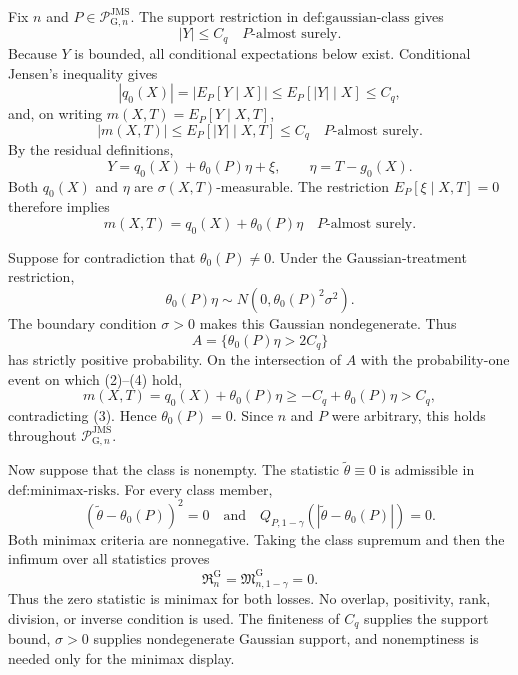 Fix \(n\) and \(P\in\mathcal P_{\mathrm G,n}^{\mathrm{JMS}}\).  The support restriction in \(\text{def:gaussian-class}\) gives
\[
 |Y|\le C_q
 \quad P\text{-almost surely}. \tag{1}
\]
Because \(Y\) is bounded, all conditional expectations below exist.  Conditional Jensen's inequality gives
\[
 |q_0(X)|=|E_P[Y\mid X]|
 \le E_P[|Y|\mid X]\le C_q, \tag{2}
\]
and, on writing \(m(X,T)=E_P[Y\mid X,T]\),
\[
 |m(X,T)|\le E_P[|Y|\mid X,T]\le C_q
 \quad P\text{-almost surely}. \tag{3}
\]
By the residual definitions,
\[
 Y=q_0(X)+\theta_0(P)\eta+\xi,
 \qquad
 \eta=T-g_0(X).
\]
Both \(q_0(X)\) and \(\eta\) are \(\sigma(X,T)\)-measurable.  The restriction \(E_P[\xi\mid X,T]=0\) therefore implies
\[
 m(X,T)=q_0(X)+\theta_0(P)\eta
 \quad P\text{-almost surely}. \tag{4}
\]

Suppose for contradiction that \(\theta_0(P)\ne0\).  Under the Gaussian-treatment restriction,
\[
 \theta_0(P)\eta
 \sim N(0,\theta_0(P)^2\sigma^2).
\]
The boundary condition \(\sigma>0\) makes this Gaussian nondegenerate.  Thus
\[
 A=\{\theta_0(P)\eta>2C_q\}
\]
has strictly positive probability.  On the intersection of \(A\) with the probability-one event on which (2)--(4) hold,
\[
 m(X,T)=q_0(X)+\theta_0(P)\eta
 \ge-C_q+\theta_0(P)\eta>C_q,
\]
contradicting (3).  Hence \(\theta_0(P)=0\).  Since \(n\) and \(P\) were arbitrary, this holds throughout \(\mathcal P_{\mathrm G,n}^{\mathrm{JMS}}\).

Now suppose that the class is nonempty.  The statistic \(\widetilde\theta\equiv0\) is admissible in \(\text{def:minimax-risks}\).  For every class member,
\[
 (\widetilde\theta-\theta_0(P))^2=0
 \quad\text{and}\quad
 Q_{P,1-\gamma}(|\widetilde\theta-\theta_0(P)|)=0.
\]
Both minimax criteria are nonnegative.  Taking the class supremum and then the infimum over all statistics proves
\[
 \mathfrak R_n^{\mathrm G}
 =\mathfrak M_{n,1-\gamma}^{\mathrm G}
 =0.
\]
Thus the zero statistic is minimax for both losses.  No overlap, positivity, rank, division, or inverse condition is used.  The finiteness of \(C_q\) supplies the support bound, \(\sigma>0\) supplies nondegenerate Gaussian support, and nonemptiness is needed only for the minimax display.
